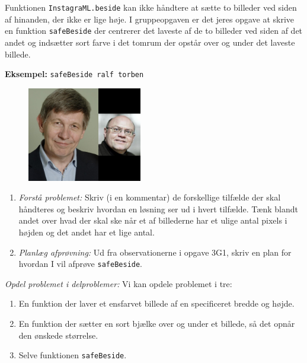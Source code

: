 \documentclass[a4paper,12pt]{article}
\begin{document}
Funktionen \verb|InstagraML.beside| kan ikke håndtere at sætte to
billeder ved siden af hinanden, der ikke er lige høje. I gruppeopgaven
er det jeres opgave at skrive en funktion \verb|safeBeside| der
centrerer det laveste af de to billeder ved siden af det andet og
indsætter sort farve i det tomrum der opstår over og under det laveste
billede.

\vspace{5mm}
\textbf{Eksempel:} \verb|safeBeside ralf torben|
\begin{figure}[h!]
  \centering
  \includegraphics[width=5cm]{uge3_ralfTorben.png}
  \label{fig:safeBeside}
\end{figure}
\vspace{-5mm}

\begin{enumerate}[{3G}1]
\item \textit{Forstå problemet:} Skriv (i en kommentar) de forskellige
  tilfælde der skal håndteres og beskriv hvordan en løsning ser ud i
  hvert tilfælde. Tænk blandt andet over hvad der skal ske når et af
  billederne har et ulige antal pixels i højden og det andet har et
  lige antal.

\item \textit{Planlæg afprøvning:} Ud fra observationerne i opgave
  3G1, skriv en plan for hvordan I vil afprøve \texttt{safeBeside}.
\end{enumerate}

\textit{Opdel problemet i delproblemer:} Vi kan opdele problemet
  i tre:
  \begin{enumerate}[~~a)]
  \item En funktion der laver et ensfarvet billede af en specificeret
    bredde og højde.
\item En funktion der sætter en sort bjælke over og under et billede,
  så det opnår den ønskede størrelse.
\item Selve funktionen \verb|safeBeside|.
  \end{enumerate}
\end{document}
